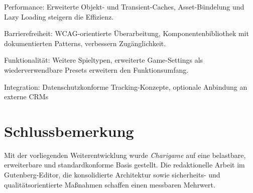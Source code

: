 Performance: Erweiterte Objekt- und Transient-Caches, Asset-Bündelung und Lazy Loading steigern die Effizienz.

Barrierefreiheit: WCAG-orientierte Überarbeitung, Komponentenbibliothek mit dokumentierten Patterns, verbessern Zugänglichkeit.

Funktionalität: Weitere Spieltypen, erweiterte Game-Settings als wiederverwendbare Presets erweitern den Funktionsumfang.

Integration: Datenschutzkonforme Tracking-Konzepte, optionale Anbindung an externe CRMs

\section{Schlussbemerkung}
Mit der vorliegenden Weiterentwicklung wurde \textit{Charigame} auf eine belastbare, erweiterbare und standardkonforme Basis gestellt.
Die redaktionelle Arbeit im Gutenberg-Editor, die konsolidierte Architektur sowie sicherheits- und qualitätsorientierte Maßnahmen schaffen einen messbaren Mehrwert.

